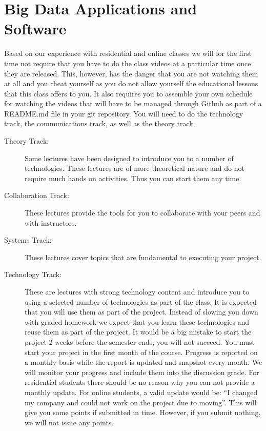 \chapter{Big Data Applications and Software}

\FILENAME

Based on our experience with residential and online classes we will for
the first time not require that you have to do the class videos at a
particular time once they are released. This, however, has the danger
that you are not watching them at all and you cheat yourself as you do
not allow yourself the educational lessons that this class offers to
you. It also requires you to assemble your own schedule for watching the
videos that will have to be managed through Github as part of a
README.md file in your git repository. You will need to do the
technology track, the communications track, as well as the theory track.

\begin{description}

\item[Theory Track:]
Some lectures have been designed to introduce you to a number of
technologies. These lectures are of more theoretical nature and do not
require much hands on activities. Thus you can start them any time.

\item[Collaboration Track:]
These lectures provide the tools for you to collaborate with your peers
and with instructors.

\item[Systems Track:]
These lectures cover topics that are fundamental to executing your
project.

\item[Technology Track:]
These are lectures with strong technology content and introduce you to
using a selected number of technologies as part of the class. It is
expected that you will use them as part of the project. Instead of
slowing you down with graded homework we expect that you learn these
technologies and reuse them as part of the project. It would be a big
mistake to start the project 2 weeks before the semester ends, you will
not succeed. You must start your project in the first month of the
course. Progress is reported on a monthly basis while the report is
updated and snapshot every month. We will monitor your progress and
include them into the discussion grade. For residential students there
should be no reason why you can not provide a monthly update. For online
students, a valid update would be: ``I changed my company and could not
work on the project due to moving''. This will give you some points if
submitted in time. However, if you submit nothing, we will not issue any
points.

\end{description}

